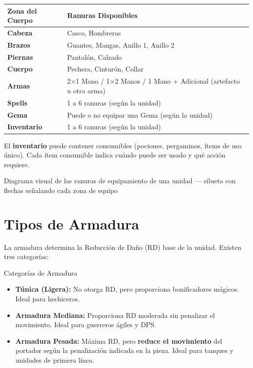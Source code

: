 \begin{tabularx}{\linewidth}{|l|X|}
\hline
\rowcolor{HammerRed!15} \textbf{Zona del Cuerpo} & \textbf{Ranuras Disponibles} \\ \hline
\textbf{Cabeza} & Casco, Hombreras \\ \hline
\textbf{Brazos} & Guantes, Mangas, Anillo 1, Anillo 2 \\ \hline
\textbf{Piernas} & Pantalón, Calzado \\ \hline
\textbf{Cuerpo} & Pechera, Cinturón, Collar \\ \hline
\textbf{Armas} & 2×1 Mano / 1×2 Manos / 1 Mano + Adicional (artefacto u otra arma) \\ \hline
\textbf{Spells} & 1 a 6 ranuras (según la unidad) \\ \hline
\textbf{Gema} & Puede o no equipar una Gema (según la unidad) \\ \hline
\textbf{Inventario} & 1 a 6 ranuras (según la unidad) \\ \hline
\end{tabularx}

\vspace{0.3cm}

El \textbf{inventario} puede contener consumibles (pociones, pergaminos, ítems de uso único). Cada ítem consumible indica cuándo puede ser usado y qué acción requiere.

\begin{imagebox}{Diagrama visual de las ranuras de equipamiento de una unidad — silueta con flechas señalando cada zona de equipo}
    \vspace{3.5cm}
\end{imagebox}

\section{Tipos de Armadura}

La armadura determina la Reducción de Daño (RD) base de la unidad. Existen tres categorías:

\begin{reglaespecial}{Categorías de Armadura}
\begin{itemize}
    \item \textbf{Túnica (Ligera):} No otorga RD, pero proporciona bonificadores mágicos. Ideal para hechiceros.
    \item \textbf{Armadura Mediana:} Proporciona RD moderada sin penalizar el movimiento. Ideal para guerreros ágiles y DPS.
    \item \textbf{Armadura Pesada:} Máxima RD, pero \textbf{reduce el movimiento} del portador según la penalización indicada en la pieza. Ideal para tanques y unidades de primera línea.
\end{itemize}
\end{reglaespecial}

